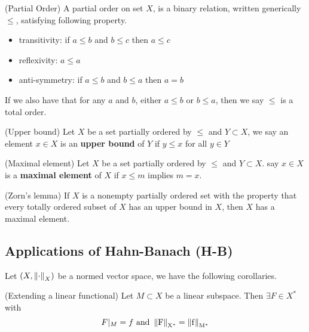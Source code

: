 \documentclass{article}
\begin{document}
\begin{definition}
(Partial Order)
	A partial order on set $X$, is a binary relation, written generically $\leq$, satisfying following property.
	\begin{itemize}
		\item transitivity: if $a\leq b$ and $b\leq c$ then $a\leq c$
		\item reflexivity: $a\leq a$
		\item anti-symmetry: if $a\leq b$ and $b\leq a$ then $a=b$

	\end{itemize}
	If we also have that for any $a$ and $b$, either $a\leq b$ or $b\leq a$, then we say $\leq$ is a total order.

\end{definition}

\begin{definition}
(Upper bound)
	Let $X$ be a set partially ordered by $\leq$ and $Y\subset X$, we say an element $x\in X$ is an {\bf upper bound} of $Y$ if $y\leq x$ for all $y \in Y$

\end{definition}

\begin{definition}
(Maximal element)
	Let $X$ be a set partially ordered by $\leq$ and $Y\subset X$. say $x\in X$ is a \textbf{maximal element} of $X$ if $x\leq m$ implies $m=x$.

\end{definition}
\begin{lemma}
(Zorn's lemma)
\label{Zorn's Lemma}
	If $X$ is a nonempty partially ordered set with the
	property that every totally ordered subset of $X$ has an upper bound in $X$, then $X$ has
	a maximal element.
\end{lemma}


\subsection{Applications of Hahn-Banach (H-B)}  

Let $(X, \left\|{\cdot}\right\|_X)$ be a normed vector space, we have the following corollaries.  

\begin{corollary}
\label{same norm extension}
(Extending a linear functional)  
Let $M \subset X$ be a linear subspace. Then $\exists F \in X^*$ with 
$$F |_M = f \ \rm{and} \ \norm{F}_{X^*}=\norm{f}_{M^*}$$
\end{corollary}
\end{document}

